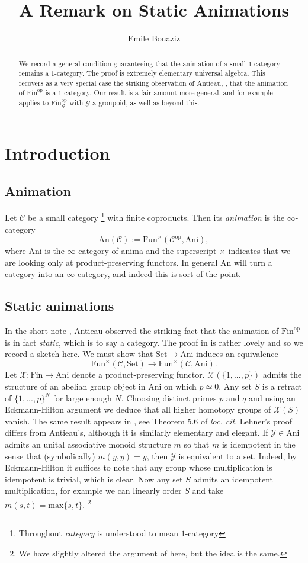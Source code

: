 \documentclass[11pt, oneside]{amsart}       %
\title{A Remark on Static Animations}
\author{Emile Bouaziz}
\theoremstyle{remark}
\newcommand{\YY}{\mathcal{Y}}
\newcommand{\XX}{\mathcal{X}}
\newcommand{\cC}{\mathscr{C}}
\newcommand{\ani}{\mathrm{Ani}}
\newcommand{\fnt}{\mathrm{Fin}}
\begin{document}
\maketitle
\begin{abstract}
We record a general condition guaranteeing that the animation of a small $1$-category remains a $1$-category. The proof is extremely elementary universal algebra. This recovers as a very special case the striking observation of Antieau, \cite{Ant}, that the animation of $\fnt^{\mathrm{op}}$ is a $1$-category. Our result is a fair amount more general, and for example applies to $\fnt^{\mathrm{op}}_{\mathcal{G}}$ with $\mathcal{G}$ a groupoid, as well as beyond this.
\end{abstract}

\section{Introduction} \subsection{Animation} Let $\cC$ be a small category \footnote{Throughout \emph{category} is understood to mean $1$-category} with finite coproducts. Then its \emph{animation} is the $\infty$-category $$\text{An}(\cC):=\mathrm{Fun}^{\times}(\cC^{\mathrm{op}},\mathrm{Ani}),$$ where $\mathrm{Ani}$ is the $\infty$-category of anima and the superscript $\times$ indicates that we are looking only at product-preserving functors. In general $\mathrm{An}$ will turn a category into an $\infty$-category, and indeed this is sort of the point. \subsection{Static animations} In the short note \cite{Ant}, Antieau observed the striking fact that the animation of $\fnt^{\text{op}}$ is in fact \emph{static}, which is to say a category. The proof in \cite{Ant} is rather lovely and so we record a sketch here. We must show that $\mathrm{Set}\to\mathrm{Ani}$ induces an equivalence $$\mathrm{Fun}^{\times}(\cC,\mathrm{Set})\to \mathrm{Fun}^{\times}(\cC,\mathrm{Ani}).$$ Let $\XX:\fnt\to\ani$ denote a product-preserving functor. $\XX(\{1,...,p\})$ admits the structure of an abelian group object in $\ani$ on which $p\simeq 0$. Any set $S$ is a retract of $\{1,...,p\}^N$ for large enough $N$. Choosing distinct primes $p$ and $q$ and using an Eckmann-Hilton argument we deduce that all higher homotopy groups of $\XX(S)$ vanish.  The same result appears in \cite{Leh}, see Theorem 5.6 of \emph{loc. cit}. Lehner's proof differs from Antieau's, although it is similarly elementary and elegant. If $\YY\in\ani$ admits an unital associative monoid structure $m$ so that $m$ is idempotent in the sense that (symbolically) $m(y,y)=y$, then $\YY$ is equivalent to a set. Indeed, by Eckmann-Hilton it suffices to note that any group whose multiplication is idempotent is trivial, which is clear. Now any set $S$ admits an idempotent multiplication, for example we can linearly order $S$ and take $m(s,t)=\text{max}\{s,t\}.$ \footnote{We have slightly altered the argument of \cite{Leh} here, but the idea is the same.}
\end{document}
